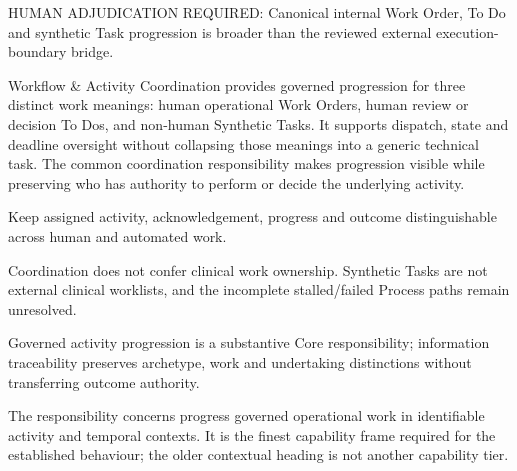 HUMAN ADJUDICATION REQUIRED: Canonical internal Work Order, To Do and synthetic Task progression is broader than the reviewed external execution-boundary bridge.



Workflow \& Activity Coordination provides governed progression for three distinct work meanings: human operational Work Orders, human review or decision To Dos, and non-human Synthetic Tasks. It supports dispatch, state and deadline oversight without collapsing those meanings into a generic technical task. The common coordination responsibility makes progression visible while preserving who has authority to perform or decide the underlying activity.



Keep assigned activity, acknowledgement, progress and outcome distinguishable across human and automated work.



Coordination does not confer clinical work ownership. Synthetic Tasks are not external clinical worklists, and the incomplete stalled/\allowbreak{}failed Process paths remain unresolved.



Governed activity progression is a substantive Core responsibility; information traceability preserves archetype, work and undertaking distinctions without transferring outcome authority.



The responsibility concerns progress governed operational work in identifiable activity and temporal contexts. It is the finest capability frame required for the established behaviour; the older contextual heading is not another capability tier.


